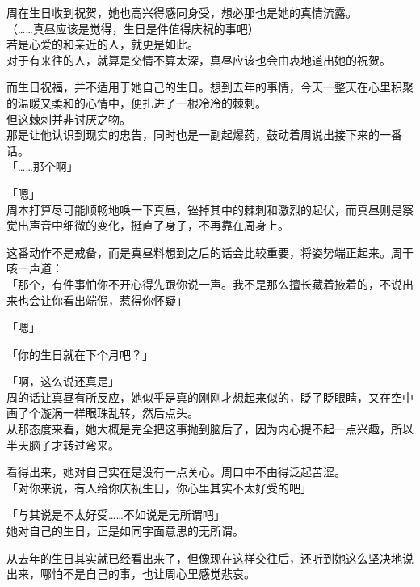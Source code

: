 周在生日收到祝贺，她也高兴得感同身受，想必那也是她的真情流露。\\

（……真昼应该是觉得，生日是件值得庆祝的事吧）\\

若是心爱的和亲近的人，就更是如此。\\

对于有来往的人，就算是交情不算太深，真昼应该也会由衷地道出她的祝贺。

而生日祝福，并不适用于她自己的生日。想到去年的事情，今天一整天在心里积聚的温暖又柔和的心情中，便扎进了一根冷冷的棘刺。\\

但这棘刺并非讨厌之物。\\

那是让他认识到现实的忠告，同时也是一副起爆药，鼓动着周说出接下来的一番话。\\

「……那个啊」

「嗯」\\

周本打算尽可能顺畅地唤一下真昼，锉掉其中的棘刺和激烈的起伏，而真昼则是察觉出声音中细微的变化，挺直了身子，不再靠在周身上。

这番动作不是戒备，而是真昼料想到之后的话会比较重要，将姿势端正起来。周干咳一声道：\\

「那个，有件事怕你不开心得先跟你说一声。我不是那么擅长藏着掖着的，不说出来也会让你看出端倪，惹得你怀疑」

「嗯」

「你的生日就在下个月吧？」

「啊，这么说还真是」\\

周的话让真昼有所反应，她似乎是真的刚刚才想起来似的，眨了眨眼睛，又在空中画了个漩涡一样眼珠乱转，然后点头。\\

从那态度来看，她大概是完全把这事抛到脑后了，因为内心提不起一点兴趣，所以半天脑子才转过弯来。

看得出来，她对自己实在是没有一点关心。周口中不由得泛起苦涩。\\

「对你来说，有人给你庆祝生日，你心里其实不太好受的吧」

「与其说是不太好受……不如说是无所谓吧」\\

她对自己的生日，正是如同字面意思的无所谓。

从去年的生日其实就已经看出来了，但像现在这样交往后，还听到她这么坚决地说出来，哪怕不是自己的事，也让周心里感觉悲哀。\\

